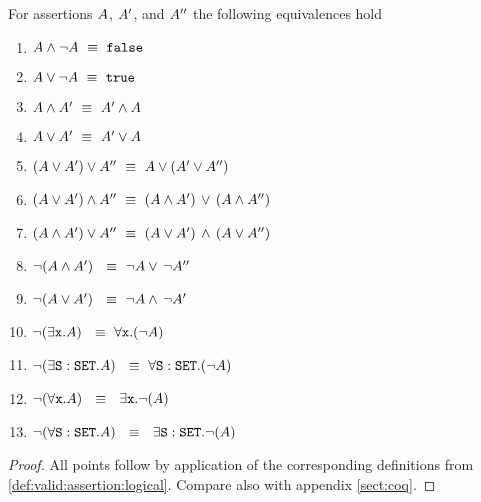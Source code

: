  \begin{lemma}
 \label{lemma:classic:two}
For     assertions $A$, $A'$, and $A''$ the following equivalences hold
\label{lemma:basic_assertions_classical}
\begin{enumerate}
\item
$ A \wedge\neg A \ \equiv \  {\mbox{\tt{false}}}$
\item
$ A \vee \neg A   \ \equiv \  {\mbox{\tt{true}}}$
\item
$ A \wedge A'  \ \equiv \  A' \wedge A$
\item
$ A \vee A'  \ \equiv \  A' \vee A$
\item
$(A \vee A') \vee A'' \ \equiv \  A \vee (A' \vee A'')$
\item
$(A \vee A') \wedge A'' \ \equiv \  (A \wedge A')\, \vee\, (A \wedge A'')$
\item
$(A \wedge A') \vee A'' \ \equiv \  (A \vee A')\, \wedge\, (A \vee A'')$
\item
$\neg (A \wedge A') \  \ \equiv \  \neg  A   \vee\, \neg A''$
\item
$\neg (A \vee A') \  \ \equiv \  \neg  A   \wedge\, \neg A'$
\item
$\neg (\exists \prg{x}.\A )  \  \ \equiv \  \forall \prg{x}.(\neg  \A)$
\item
$\neg (\exists {\mbox{\tt{S}}}:{\mbox{\tt{SET}}}.A )  \  \ \equiv \  \forall {\mbox{\tt{S}}}:{\mbox{\tt{SET}}}.(\neg  A)$
\item
$\neg (\forall \prg{x}. \A)  \  \ \equiv \  \  \exists \prg{x}.\neg(\A )$
\item
$\neg (\forall {\mbox{\tt{S}}}:{\mbox{\tt{SET}}}. A)  \  \ \equiv \  \  \exists {\mbox{\tt{S}}}:{\mbox{\tt{SET}}}.\neg(A )$
\end{enumerate}
\end{lemma}
\begin{proof}
All points follow by application of the corresponding definitions from \ref{def:valid:assertion:logical}. %
Compare also with appendix \ref{sect:coq}.
 \end{proof}

